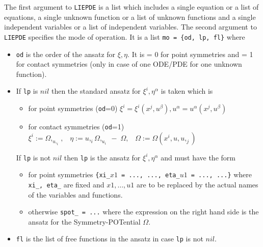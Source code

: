 The first argument to {\tt LIEPDE} is a list which includes
a single equation or a list of equations,
a single unknown function or a list of unknown functions and
a single independent variables or a list of independent variables.
The second argument to {\tt LIEPDE} specifies the mode of operation.
It is a list {\tt mo = \{od, lp, fl\}} where
\begin{itemize}
\item {\tt od} is the order of the ansatz for $\xi, \eta.$ It is = 0 for
point symmetries and = 1 for contact symmetries (only in case of
one ODE/PDE for one unknown function).
\item If {\tt lp} is $nil$ then the standard ansatz for $\xi^i, \eta^\alpha$
is taken which is
\begin{itemize}
\item for point symmetries ({\tt od}=0) $\xi^i = \xi^i(x^j,u^\beta),
      u^\alpha = u^\alpha(x^j,u^\beta)$
\item for contact symmetries ({\tt od}=1)
   $ \xi^i := \Omega,_{u,_i}, \;\;\;
     \eta := u,_i\Omega,_{u_i} \; - \; \Omega, \;\;\;
     \Omega:=\Omega(x^i, u, u,_j)$
\end{itemize}


If {\tt lp} is not $nil$ then {\tt lp} is the ansatz for
$\xi^i, \eta^\alpha$ and must have the form
\begin{itemize}
  \item for point symmetries
        {\tt \{xi\_\mbox{$x1$} = ..., ..., eta\_\mbox{$u1$} = ..., ...\}}
        where {\tt xi\_, eta\_}
        are fixed and $x1, \ldots, u1$ are to be replaced by the actual names
        of the variables and functions.
  \item otherwise {\tt spot\_ = ...} where the expression on the right hand
        side is the ansatz for the Symmetry-POTential $\Omega.$
\end{itemize}

\item {\tt fl} is the list of free functions in the ansatz 
in case {\tt lp} is not $nil.$
\end{itemize}

